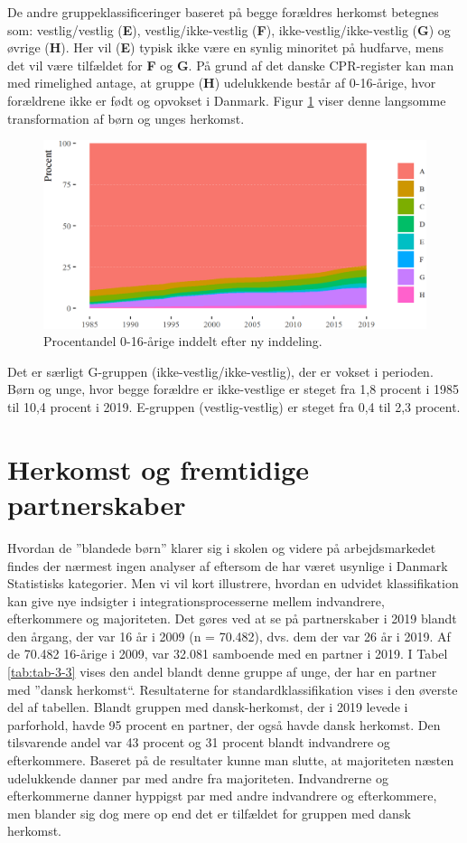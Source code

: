 \documentclass[
]{book}
\begin{document}
De andre gruppeklassificeringer baseret på begge forældres herkomst betegnes som: vestlig/vestlig (\textbf{E}), vestlig/ikke-vestlig (\textbf{F}), ikke-vestlig/ikke-vestlig (\textbf{G}) og øvrige (\textbf{H}). Her vil (\textbf{E}) typisk ikke være en synlig minoritet på hudfarve, mens det vil være tilfældet for \textbf{F} og \textbf{G}. På grund af det danske CPR-register kan man med rimelighed antage, at gruppe (\textbf{H}) udelukkende består af 0-16-årige, hvor forældrene ikke er født og opvokset i Danmark. Figur \ref{fig:fig-3-01} viser denne langsomme transformation af børn og unges herkomst.

\begin{figure}
\includegraphics[width=0.75\linewidth]{images/figur_3_1} \caption{ Procentandel 0-16-årige inddelt efter ny inddeling.}\label{fig:fig-3-01}
\end{figure}

Det er særligt G-gruppen (ikke-vestlig/ikke-vestlig), der er vokset i perioden. Børn og unge, hvor begge forældre er ikke-vestlige er steget fra 1,8 procent i 1985 til 10,4 procent i 2019. E-gruppen (vestlig-vestlig) er steget fra 0,4 til 2,3 procent.

\section{Herkomst og fremtidige partnerskaber}\label{herkomst-og-fremtidige-partnerskaber}

Hvordan de ''blandede børn'' klarer sig i skolen og videre på arbejdsmarkedet findes der nærmest ingen analyser af eftersom de har været usynlige i Danmark Statistisks kategorier. Men vi vil kort illustrere, hvordan en udvidet klassifikation kan give nye indsigter i integrationsprocesserne mellem indvandrere, efterkommere og majoriteten. Det gøres ved at se på partnerskaber i 2019 blandt den årgang, der var 16 år i 2009 (n = 70.482), dvs. dem der var 26 år i 2019. Af de 70.482 16-årige i 2009, var 32.081 samboende med en partner i 2019. I Tabel \ref{tab:tab-3-3} vises den andel blandt denne gruppe af unge, der har en partner med ''dansk herkomst``. Resultaterne for standardklassifikation vises i den øverste del af tabellen. Blandt gruppen med dansk-herkomst, der i 2019 levede i parforhold, havde 95 procent en partner, der også havde dansk herkomst. Den tilsvarende andel var 43 procent og 31 procent blandt indvandrere og efterkommere. Baseret på de resultater kunne man slutte, at majoriteten næsten udelukkende danner par med andre fra majoriteten. Indvandrerne og efterkommerne danner hyppigst par med andre indvandrere og efterkommere, men blander sig dog mere op end det er tilfældet for gruppen med dansk herkomst.
\end{document}
